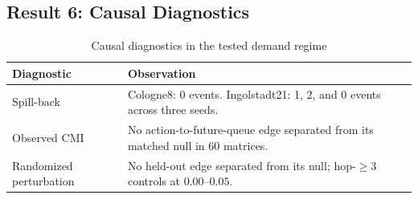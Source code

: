 \documentclass[journal]{IEEEtran}
\theoremstyle{definition}
\begin{document}

\subsection{Result 6: Causal Diagnostics}
\label{sec:exp-perturb}

\begin{table}[t]
    \centering
    \caption{Causal diagnostics in the tested demand regime}
    \label{tab:causal}
    \footnotesize
    \begin{tabular}{@{}p{}p{}@{}}
        \toprule
        Diagnostic              & Observation                                                                       \\
        \midrule
        Spill-back              & Cologne8: 0 events. Ingolstadt21: 1, 2, and 0 events across three seeds.          \\
        Observed CMI            & No action-to-future-queue edge separated from its matched null in 60 matrices.    \\
        Randomized perturbation & No held-out edge separated from its null; hop-$\geq3$ controls at $0.00$--$0.05$. \\
        \bottomrule
    \end{tabular}
\end{table}
\end{document}
